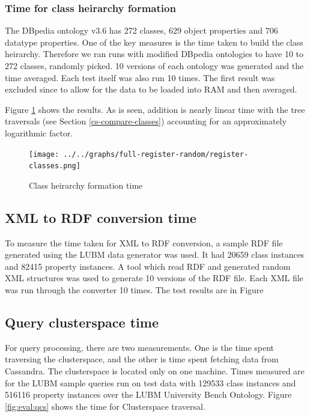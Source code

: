 \documentclass[conference]{IEEEtran}
\begin{document}
\subsubsection{Time for class heirarchy formation}

The DBpedia ontology v3.6 has 272 classes, 629 object properties and 706
datatype properties. One of the key measures is the time taken to build the
class heirarchy. Therefore we ran runs with modified DBpedia ontologies to have
10 to 272 classes, randomly picked. 10 versions of each ontology was generated
and the time averaged. Each test itself was also run 10 times. The first
result was excluded since to allow for the data to be loaded into RAM and
then averaged.

Figure \ref{fig:eval:cs-ch-form} shows the results. As is seen, addition is
nearly linear time with the tree traversals (see Section
\ref{cs-compare-classes}) accounting for an approximately logarithmic factor.

\begin{figure}[h]
    \centering
    \texttt{[image: ../../graphs/full-register-random/register-classes.png]}
    \caption{Class heirarchy formation time}
    \label{fig:eval:cs-ch-form}
\end{figure}

\subsection{XML to RDF conversion time}

To measure the time taken for XML to RDF conversion, a sample RDF file
generated using the LUBM data generator was used. It had 20659 class instances
and 82415 property instances. A tool which read RDF and generated random XML structures
was used to generate 10 versions of the RDF file. Each XML file was run through the converter 10 times. The test results are in Figure %

\subsection{Query clusterspace time}

For query processing, there are two measurements. One is the time spent traversing the clusterspace, and the other is time spent fetching data from Cassandra. The clusterspace is located only on one machine. Times measured are for the LUBM sample queries run on test data with 129533 class instances and 516116 property instances over the LUBM University Bench Ontology. Figure \ref{fig:eval:qcs} shows the time for Clusterspace traversal.
\end{document}
